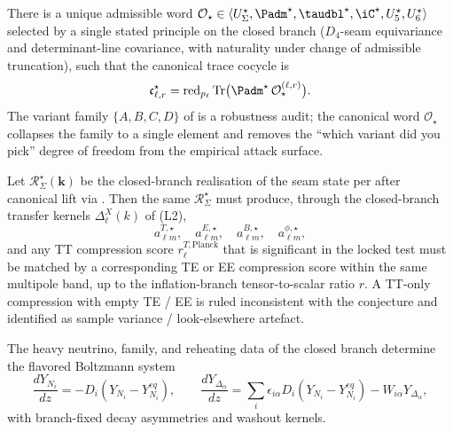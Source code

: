 \begin{conjecture}
\label{conj:canonical-trace-word}
There is a unique admissible word
$\mathcal O_\star\in\langle U_\Sigma^\star,\Padm^\star,\taudbl^\star,\iC^\star,U_5^\star,U_6^\star\rangle$
selected by a single stated principle on the closed branch ($D_4$-seam equivariance and
determinant-line covariance, with naturality under change of admissible truncation), such that the
canonical trace cocycle is
\[
\mathfrak c_{\ell,r}^\star
=
\operatorname{red}_{p_\ell}\operatorname{Tr}\bigl(\Padm^\star\,\mathcal O_\star^{(\ell,r)}\bigr).
\]
The variant family $\{A,B,C,D\}$ of  is a robustness audit; the
canonical word $\mathcal O_\star$ collapses the family to a single element and removes the
``which variant did you pick'' degree of freedom from the empirical attack surface.
\end{conjecture}

\begin{conjecture}
\label{conj:polarisation-cross-check}
Let $\mathcal R_\Sigma^\star(\mathbf k)$ be the closed-branch realisation of the seam state per
 after canonical lift via
. Then the same $\mathcal R_\Sigma^\star$
must produce, through the closed-branch transfer kernels $\Delta_\ell^X(k)$ of (L2),
\[
a_{\ell m}^{T,\star},\quad
a_{\ell m}^{E,\star},\quad
a_{\ell m}^{B,\star},\quad
a_{\ell m}^{\phi,\star},
\]
and any TT compression score $r_\ell^{T,\mathrm{Planck}}$ that is significant in the locked test
must be matched by a corresponding TE or EE compression score within the same multipole band, up
to the inflation-branch tensor-to-scalar ratio $r$. A TT-only compression with empty TE / EE is
ruled inconsistent with the conjecture and identified as sample variance / look-elsewhere
artefact.
\end{conjecture}

\begin{conjecture}
\label{thm:flavored_boltzmann_closure_baryogenesis}
The heavy neutrino, family, and reheating data of the closed branch determine the flavored
Boltzmann system
\[
\frac{dY_{N_i}}{dz}=-D_i(Y_{N_i}-Y_{N_i}^{eq}),
\qquad
\frac{dY_{\Delta_\alpha}}{dz}
=
\sum_i \epsilon_{i\alpha}D_i(Y_{N_i}-Y_{N_i}^{eq})-W_{i\alpha}Y_{\Delta_\alpha},
\]
with branch-fixed decay asymmetries and washout kernels.
\end{conjecture}

